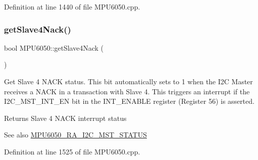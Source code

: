 Definition at line 1440 of file M\+P\+U6050.\+cpp.


\begin{DoxyCode}{0}

\end{DoxyCode}
\mbox{\label{classMPU6050_ae9882b425cbdced4de325b608d896e10}} 
\subsubsection{\texorpdfstring{getSlave4Nack()}{getSlave4Nack()}}
{\footnotesize\ttfamily bool M\+P\+U6050\+::get\+Slave4\+Nack (\begin{DoxyParamCaption}{ }\end{DoxyParamCaption})}

Get Slave 4 N\+A\+CK status. This bit automatically sets to 1 when the I2C Master receives a N\+A\+CK in a transaction with Slave 4. This triggers an interrupt if the I2\+C\+\_\+\+M\+S\+T\+\_\+\+I\+N\+T\+\_\+\+EN bit in the I\+N\+T\+\_\+\+E\+N\+A\+B\+LE register (Register 56) is asserted. \begin{DoxyReturn}{Returns}
Slave 4 N\+A\+CK interrupt status 
\end{DoxyReturn}
\begin{DoxySeeAlso}{See also}
\mbox{\hyperlink{MPU6050_8h_a5ef54580f436c198fb84d01288fbef49}{M\+P\+U6050\+\_\+\+R\+A\+\_\+\+I2\+C\+\_\+\+M\+S\+T\+\_\+\+S\+T\+A\+T\+US}} 
\end{DoxySeeAlso}


Definition at line 1525 of file M\+P\+U6050.\+cpp.



